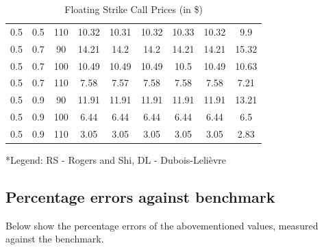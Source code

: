 \documentclass{article}
\begin{document}
\begin{table}[H]
\begin{tabular}{|c|c|c|c|c|c|c|c|c|}
  0.5 & 0.5 & 110 & 10.32 & 10.31 & 10.32 & 10.33 & 10.32 & 9.9 \\
  0.5 & 0.7 & 90 & 14.21 & 14.2 & 14.2 & 14.21 & 14.21 & 15.32 \\
  0.5 & 0.7 & 100 & 10.49 & 10.49 & 10.49 & 10.5 & 10.49 & 10.63 \\
  0.5 & 0.7 & 110 & 7.58 & 7.57 & 7.58 & 7.58 & 7.58 & 7.21 \\
  0.5 & 0.9 & 90 & 11.91 & 11.91 & 11.91 & 11.91 & 11.91 & 13.21 \\
  0.5 & 0.9 & 100 & 6.44 & 6.44 & 6.44 & 6.44 & 6.44 & 6.5 \\
  0.5 & 0.9 & 110 & 3.05 & 3.05 & 3.05 & 3.05 & 3.05 & 2.83 \\
  \hline
  \end{tabular}
  \caption{Floating Strike Call Prices (in \$)}
  \label{table:name}
\end{table}
\scriptsize
*Legend: RS - Rogers and Shi, DL - Dubois-Leli\`{e}vre
\normalsize

\subsection{Percentage errors against benchmark}
Below show the percentage errors of the abovementioned values, measured against the benchmark.
\end{document}
